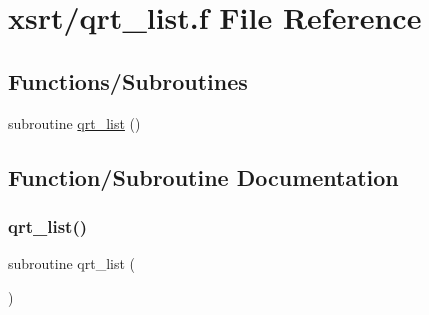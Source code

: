 \hypertarget{qrt__list_8f}{}\section{xsrt/qrt\+\_\+list.f File Reference}
\label{qrt__list_8f}
\subsection*{Functions/\+Subroutines}
\begin{DoxyCompactItemize}
\item 
subroutine \hyperlink{qrt__list_8f_ad262c060814606a03359819dcc03c56d}{qrt\+\_\+list} ()
\end{DoxyCompactItemize}


\subsection{Function/\+Subroutine Documentation}
\mbox{\label{qrt__list_8f_ad262c060814606a03359819dcc03c56d}} 
\subsubsection{\texorpdfstring{qrt\+\_\+list()}{qrt\_list()}}
{\footnotesize\ttfamily subroutine qrt\+\_\+list (\begin{DoxyParamCaption}{ }\end{DoxyParamCaption})}

